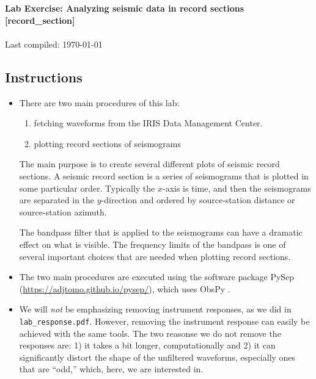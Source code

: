 \documentclass[11pt,titlepage,fleqn]{article}
\begin{document}

\begin{spacing}{1.2}
\centering
{\large \bf Lab Exercise: Analyzing seismic data in record sections [record\_section]} \\
\cltag\ \\
Last compiled: \today
\end{spacing}

\vspace{-0.25cm}
\subsection*{Instructions}

\begin{itemize}
\item There are two main procedures of this lab:
\begin{enumerate}
\item fetching waveforms from the IRIS Data Management Center.
\item plotting record sections of seismograms
\end{enumerate}
%
The main purpose is to create several different plots of seismic record sections. A seismic record section is a series of seismograms that is plotted in some particular order. Typically the $x$-axis is time, and then the seismograms are separated in the $y$-direction and ordered by source-station distance or source-station azimuth.

The bandpass filter that is applied to the seismograms can have a dramatic effect on what is visible. The frequency limits of the bandpass is one of several important choices that are needed when plotting record sections.

\item The two main procedures are executed using the software package PySep (\url{https://adjtomo.github.io/pysep/}), which uses ObsPy \citep{obspy2010,obspy2011,obspy2015}.

\item We will {\em not} be emphasizing removing instrument responses, as we did in \verb+lab_response.pdf+. However, removing the instrument response can easily be achieved with the same tools. The two reasonse we do not remove the responses are: 1) it takes a bit longer, computationally and 2) it can significantly distort the shape of the unfiltered waveforms, especially ones that are ``odd,'' which, here, we are interested in.


\end{itemize}
\end{document}
